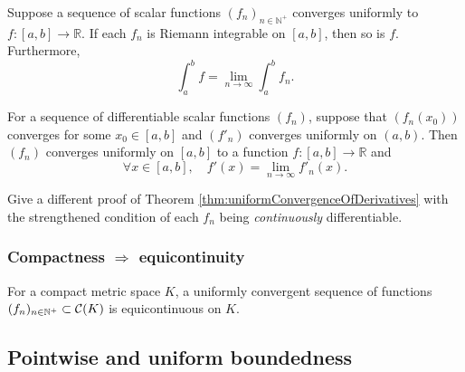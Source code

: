 \begin{thm}
  \label{thm:uniformConvAndIntegral}
  Suppose a sequence of scalar functions $(f_n)_{n\in\mathbb{N}^+}$
  converges uniformly to $f:[a,b]\rightarrow \mathbb{R}$.
  If each $f_n$ is Riemann integrable on $[a,b]$,
  then so is $f$. Furthermore, 
  \begin{equation}
    \label{eq:uniformConvAndIntegral}
    \int_a^bf = \lim_{n\rightarrow \infty} \int_a^bf_n. 
  \end{equation}
\end{thm}


\begin{thm}
  \label{thm:uniformConvergenceOfDerivatives}
  For a sequence of differentiable scalar functions $(f_n)$, 
  suppose that $(f_n(x_0))$ converges for some $x_0\in[a,b]$
  and $(f'_n)$ converges uniformly on $(a,b)$. 
  Then $(f_n)$ converges uniformly on $[a,b]$
  to a function $f: [a,b]\rightarrow \mathbb{R}$
  and
  \begin{equation}
    \label{eq:uniformConvergenceOfDerivatives}
    \forall x\in [a,b], \quad
    f'(x) = \lim_{n\rightarrow \infty} f'_n(x).
  \end{equation}
\end{thm}



\begin{exc}
  Give a different proof of Theorem
  \ref{thm:uniformConvergenceOfDerivatives}
  with the strengthened condition of
  each $f_n$ being \emph{continuously} differentiable. 
\end{exc}

\subsubsection{Compactness $\Rightarrow$ equicontinuity}

\begin{thm}
  \label{thm:uniformConvergenceAndCompact2EquiCont}
  For a compact metric space $K$,
  a uniformly convergent sequence of functions 
  $(f_n)_{n\in\mathbb{N}^+}\subset {\cal C}(K)$
  is equicontinuous on $K$. 
\end{thm}


\subsection{Pointwise and uniform boundedness}


